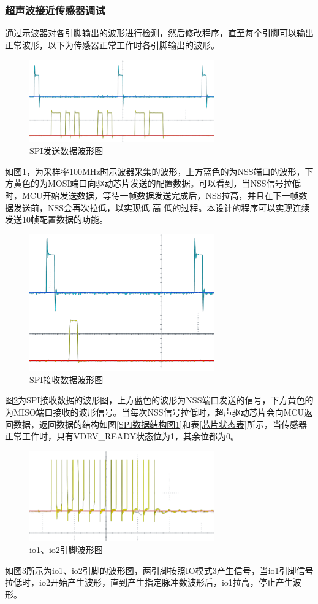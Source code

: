 \subsubsection{超声波接近传感器调试}
通过示波器对各引脚输出的波形进行检测，然后修改程序，直至每个引脚可以输出正常波形，以下为传感器正常工作时各引脚输出的波形。\par
	\begin{figure}[ht]
	    \centering
	    \includegraphics[width=8cm]{figure/debug waveform1.png}
	    \caption{SPI发送数据波形图}
	    \label{SPI发送数据波形图}
	\end{figure}
 如图\ref{SPI发送数据波形图}，为采样率100MHz时示波器采集的波形，上方蓝色的为NSS端口的波形，下方黄色的为MOSI端口向驱动芯片发送的配置数据。可以看到，当NSS信号拉低时，MCU开始发送数据，等待一帧数据发送完成后，NSS拉高，并且在下一帧数据发送前，NSS会再次拉低，以实现低-高-低的过程。本设计的程序可以实现连续发送10帧配置数据的功能。
    \begin{figure}[ht]
	    \centering
	    \includegraphics[width=8cm]{figure/debug waveform2.png}
	    \caption{SPI接收数据波形图}
	    \label{SPI接收数据波形图}
	\end{figure}
 图\ref{SPI接收数据波形图}为SPI接收数据的波形图，上方蓝色的波形为NSS端口发送的信号，下方黄色的为MISO端口接收的波形信号。当每次NSS信号拉低时，超声驱动芯片会向MCU返回数据，返回数据的结构如图\ref{SPI数据结构图1}和表\ref{芯片状态表}所示，当传感器正常工作时，只有VDRV\_READY状态位为1，其余位都为0。
   \begin{figure}[ht]
	    \centering
	    \includegraphics[width=8cm]{figure/debug waveform3.png}
	    \caption{io1、io2引脚波形图}
	    \label{io1、io2引脚波形图}
	\end{figure}
 如图\ref{io1、io2引脚波形图}所示为io1、io2引脚的波形图，两引脚按照IO模式3产生信号，当io1引脚信号拉低时，io2开始产生波形，直到产生指定脉冲数波形后，io1拉高，停止产生波形。
 

